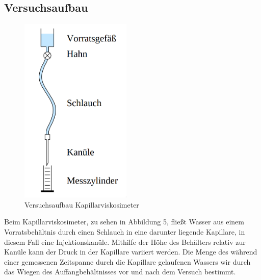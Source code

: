 \documentclass{article}
\begin{document}
\subsection{Versuchsaufbau}
\begin{figure}[H]
\centering
\includegraphics[width=150pt]{kapillar.png}
\caption{Versuchsaufbau Kapillarviskosimeter \cite{1}}
\label{fig:length_eight_mouse}
\end{figure}
Beim Kapillarviskosimeter, zu sehen in Abbildung 5, fließt Wasser aus einem Vorratsbehältnis durch einen Schlauch in eine darunter liegende Kapillare, in diesem Fall eine Injektionskanüle. Mithilfe der Höhe des Behälters relativ zur Kanüle kann der Druck in der Kapillare variiert werden. Die Menge des während einer gemessenen Zeitspanne durch die Kapillare gelaufenen Wassers wir durch das Wiegen des Auffangbehältnisses vor und nach dem Versuch bestimmt.
\end{document}
